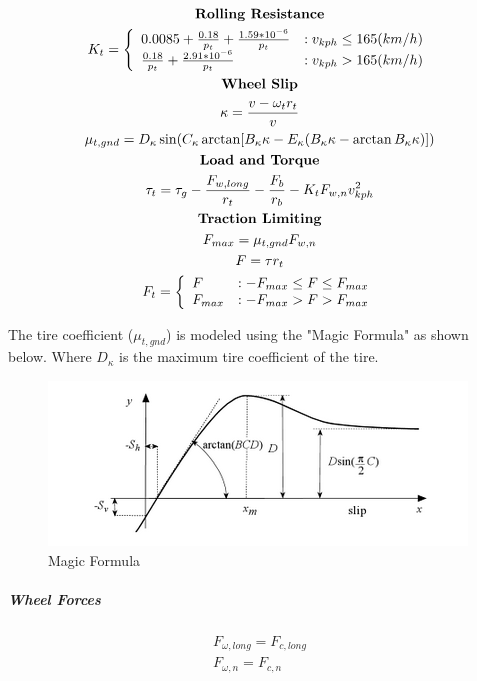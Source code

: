 \documentclass[12pt,letterpaper]{report}
\begin{document}
\begin{gather}
\notag \textbf{Rolling Resistance} \\
K_t = 
\left\{
  \begin{array}{lr}
    0.0085 + \frac{0.18}{p_t} + \frac{1.59*10^{-6}}{p_t} & : v_{kph} \le 165 (km/h)\\
    \frac{0.18}{p_t} + \frac{2.91*10^{-6}}{p_t} & : v_{kph} > 165 (km/h)
  \end{array}
\right. \\
\notag \textbf{Wheel Slip} \\
\kappa = \frac{v - \omega_t r_t}{v} \\
\mu_{t,gnd} = D_{\kappa}\sin(C_{\kappa} \arctan[B_{\kappa}\kappa - E_{\kappa}(B_{\kappa}\kappa - \arctan B_{\kappa}\kappa)]) \\
\notag \textbf{Load and Torque} \\
\tau_t = \tau_g - \frac{F_{w,long}}{r_t} - \frac{F_b}{r_b} - K_t F_{w,n} v_{kph}^2 \\
\notag \textbf{Traction Limiting} \\
F_{max} = \mu_{t,gnd} F_{w,n} \\
F = \tau r_t \\
F_t =
\left\{
  \begin{array}{lr}
	F & : -F_{max} \le F \le F_{max} \\
	F_{max} & : -F_{max} > F > F_{max}
  \end{array}
\right. 
\end{gather}

The tire coefficient ($\mu_{t,gnd}$) is modeled using the "Magic Formula" as shown below. Where $D_{\kappa}$ is the maximum tire coefficient of the tire.

 \begin{figure}[H]
  \centering
  \includegraphics[scale=1]{magic_formula}
  \caption{Magic Formula }
\end{figure}

\subparagraph{Wheel Forces}

\begin{gather}
F_{\omega,long} = F_{c,long} \\
F_{\omega,n} = F_{c,n}
\end{gather}
\end{document}
